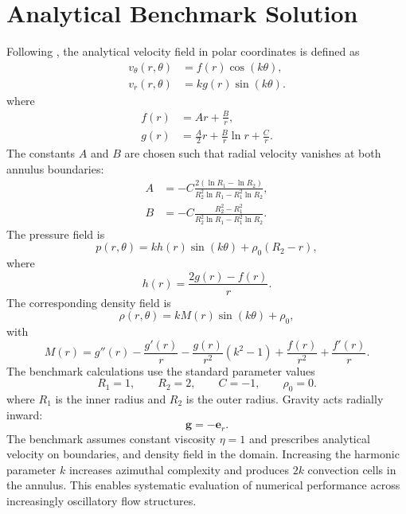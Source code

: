 \documentclass[gmd, manuscript]{copernicus}
\begin{document}
\section{Analytical Benchmark Solution}

Following , the analytical velocity field in polar coordinates is defined as
\begin{subequations}
\begin{align}
  v_\theta(r,\theta) &= f(r)\cos(k\theta), \\
  v_r(r,\theta) &= k g(r)\sin(k\theta).
\end{align}
\end{subequations}
where
\begin{subequations}
\begin{align}
  f(r) &= Ar+\frac{B}{r}, \\
  g(r) &= \frac{A}{2}r+\frac{B}{r}\ln r+\frac{C}{r}.
\end{align}
\end{subequations}
The constants \(A\) and \(B\) are chosen such that radial velocity vanishes at both annulus boundaries:
\begin{subequations}
\begin{align}
  A &= -C\frac{2(\ln R_1-\ln R_2)}{R_2^2\ln R_1-R_1^2\ln R_2}, \\
  B &= -C\frac{R_2^2-R_1^2}{R_2^2\ln R_1-R_1^2\ln R_2}.
\end{align}
\end{subequations}
The pressure field is
\begin{equation}
  p(r,\theta)=k h(r)\sin(k\theta)+\rho_0(R_2-r),
\end{equation}
where
\begin{equation}
  h(r)=\frac{2g(r)-f(r)}{r}.
\end{equation}
The corresponding density field is
\begin{equation}
  \rho(r,\theta)=kM(r)\sin(k\theta)+\rho_0,
\end{equation}
with
\begin{equation}
  M(r)=g''(r)-\frac{g'(r)}{r}
  -\frac{g(r)}{r^2}(k^2-1)
  +\frac{f(r)}{r^2}
  +\frac{f'(r)}{r}.
\end{equation}
The benchmark calculations use the standard parameter values
\[
  R_1=1,
  \qquad
  R_2=2,
  \qquad
  C=-1,
  \qquad
  \rho_0=0.
\]
where \(R_1\) is the inner radius and \(R_2\) is the outer radius.
Gravity acts radially inward:
\begin{equation}
  \mathbf{g} = -\mathbf{e}_r.
\end{equation}
The benchmark assumes constant viscosity \(\eta=1\) and prescribes analytical velocity on boundaries, and density field in the domain.
Increasing the harmonic parameter \(k\) increases azimuthal complexity and produces \(2k\) convection cells in the annulus.
This enables systematic evaluation of numerical performance across increasingly oscillatory flow structures.
\end{document}
